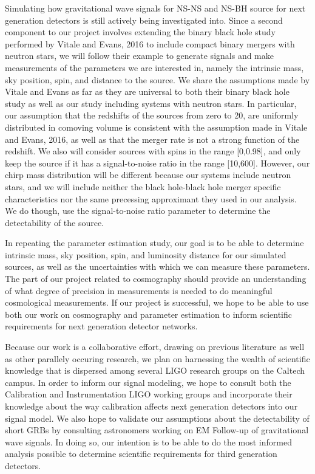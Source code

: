 \documentclass{article}
\begin{document}
Simulating how gravitational wave signals for NS-NS and NS-BH source for next generation detectors is still actively being investigated into.  Since a second component to our project involves extending the binary black hole study performed by Vitale and Evans, 2016 to include compact binary mergers with neutron stars, we will follow their example to generate signals and make measurements of the parameters we are interested in, namely the intrinsic mass, sky position, spin, and distance to the source.  We share the assumptions made by Vitale and Evans as far as they are universal to both their binary black hole study as well as our study including systems with neutron stars.  In particular, our assumption that the redshifts of the sources from zero to 20, are uniformly distributed in comoving volume is consistent with the assumption made in Vitale and Evans, 2016, as well as that the merger rate is not a strong function of the redshift.  We also will consider sources with spins in the range [0,0.98], and only keep the source if it has a signal-to-noise ratio in the range [10,600].  However, our chirp mass distribution will be different because our systems include neutron stars, and we will include neither the black hole-black hole merger specific characteristics nor the same precessing approximant they used in our analysis.  We do though, use the signal-to-noise ratio parameter to determine the detectability of the source.

In repeating the parameter estimation study, our goal is to be able to determine intrinsic mass, sky position, spin, and luminosity distance for our simulated sources, as well as the uncertainties with which we can measure these parameters.  The part of our project related to cosmography should provide an understanding of what degree of precision in measurements is needed to do meaningful cosmological measurements.  If our project is successful, we hope to be able to use both our work on cosmography and parameter estimation to inform scientific requirements for next generation detector networks.

Because our work is a collaborative effort, drawing on previous literature as well as other parallely occuring research, we plan on harnessing the wealth of scientific knowledge that is dispersed among several LIGO research groups on the Caltech campus.  In order to inform our signal modeling, we hope to consult both the Calibration and Instrumentation LIGO working  groups and incorporate their knowledge about the way calibration affects next generation detectors into our signal model.  We also hope to validate our assumptions about the detectability of short GRBs by consulting astronomers working on EM Follow-up of gravitational wave signals.  In doing so, our intention is to be able to do the most informed analysis possible to determine scientific requirements for third generation detectors.   
             
\end{document}
